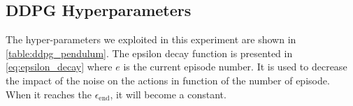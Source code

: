 \subsection{DDPG Hyperparameters}

The hyper-parameters we exploited in this experiment are shown in \vref{table:ddpg_pendulum}.
The epsilon decay function is presented in \vref{eq:epsilon_decay} where $e$ is the current episode number. It is used to decrease the impact of the noise on the actions in function of the number of episode. When it reaches the $\epsilon_{\text{end}}$, it will become a constant.

\begin{table}[!h]
	\centering
	\caption{SAC Hyper-parameter setup for Pendulum-v0 environment}
	\label{table:ddpg_pendulum}
\end{table}
